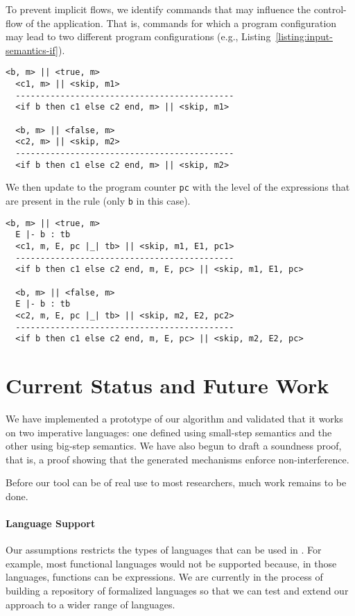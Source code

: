 \documentclass[sigplan,10pt]{acmart}\settopmatter{printfolios=true,printccs=false,printacmref=false}
\begin{document}
To prevent implicit flows, we identify commands that may influence the control-flow of the application. That is, commands for which a program configuration may lead to two different program configurations (e.g., Listing~\ref{listing:input-semantics-if}).

\begin{lstlisting}[label=listing:input-semantics-if, captionpos=b,caption={Ott big-step semantics of the if command}]
  <b, m> || <true, m>
  <c1, m> || <skip, m1>
  --------------------------------------------
  <if b then c1 else c2 end, m> || <skip, m1>
  
  <b, m> || <false, m>
  <c2, m> || <skip, m2>
  --------------------------------------------
  <if b then c1 else c2 end, m> || <skip, m2>
\end{lstlisting}
We then update to the program counter \lstinline{pc} with the level of the expressions that are present in the rule (only \lstinline{b} in this case).
\begin{lstlisting}[label=listing:output-semantics-if, captionpos=b,caption={Instrumented semantics of the if command}]
  <b, m> || <true, m>
  E |- b : tb
  <c1, m, E, pc |_| tb> || <skip, m1, E1, pc1>
  --------------------------------------------
  <if b then c1 else c2 end, m, E, pc> || <skip, m1, E1, pc>
  
  <b, m> || <false, m>
  E |- b : tb
  <c2, m, E, pc |_| tb> || <skip, m2, E2, pc2>
  --------------------------------------------
  <if b then c1 else c2 end, m, E, pc> || <skip, m2, E2, pc>
\end{lstlisting}

\section{Current Status and Future Work}
We have implemented a prototype of our algorithm and validated that it works on two  imperative languages: one defined using small-step semantics and the other using big-step semantics. We have also begun to draft a soundness proof, that is, a proof showing that the generated mechanisms enforce non-interference.

Before our tool can be of real use to most researchers, much work remains to be done.

\paragraph{Language Support} Our assumptions restricts the types of languages that can be used in \ottifc. For example, most functional languages would not be supported because, in those languages, functions can be expressions. We are currently in the process of building a repository of formalized languages so that we can test and extend our approach to a wider range of languages.
\end{document}
